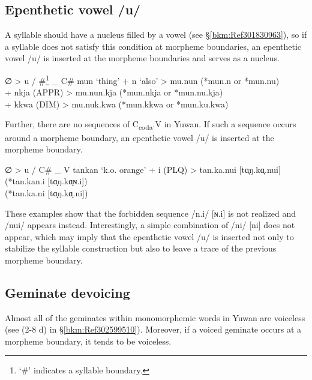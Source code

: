 \subsection{Epenthetic vowel /u/}
\label{bkm:Ref301838720}\hypertarget{RefHeadingToc395696980}{}\label{bkm:Ref347173344}
A syllable should have a nucleus filled by a vowel (see §\ref{bkm:Ref301830963}), so if a syllable does not satisfy this condition at morpheme boundaries, an epenthetic vowel /u/ is inserted at the morpheme boundaries and serves as a nucleus.

\ea  ∅   >   u   /   \#\footnote{‘\#’ indicates a syllable boundary.}   \_   C\#
\ex
\ea  mun   ‘thing’   +   n   ‘also’   >   mu.nun   (*mun.n or *mun.nu)\\
\ex  +   nkja   (APPR)   >   mu.nun.kja   (*mun.nkja or *mun.nu.kja)\\
\ex  +   kkwa   (DIM)   >   mu.nuk.kwa   (*mun.kkwa or *mun.ku.kwa)\\
\z
\z

Further, there are no sequences of C\textsubscript{coda}.V in Yuwan. If such a sequence occurs around a morpheme boundary, an epenthetic vowel /u/ is inserted at the morpheme boundary.

\ea   ∅   >   u   /   C\#   \_   V
\ex  \gll tankan   ‘k.o. orange’   +   i   (PLQ)   >   tan.ka.nui [tɑ̟ŋ.kɑ̟.nui]   (*tan.kan.i [tɑ̟ŋ.kɑ̟ɴ.i])\\
           {}         {}           {}  {}  {}      {}    {}          {}          (*tan.ka.ni [tɑ̟ŋ.kɑ̟.ni])\\
\z

These examples show that the forbidden sequence /n.i/ [ɴ.i] is not realized and /nui/ appears instead. Interestingly, a simple combination of /ni/ [ni] does not appear, which may imply that the epenthetic vowel /u/ is inserted not only to stabilize the syllable construction but also to leave a trace of the previous morpheme boundary.

\subsection{Geminate devoicing}
\label{bkm:Ref347178914}\hypertarget{RefHeadingToc395696981}{}
Almost all of the geminates within monomorphemic words in Yuwan are voiceless (see (2-8 d) in §\ref{bkm:Ref302599510}). Moreover, if a voiced geminate occurs at a morpheme boundary, it tends to be voiceless.

